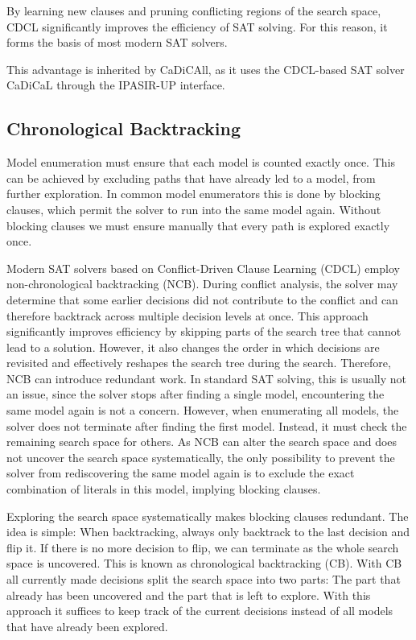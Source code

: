 \documentclass[12pt,a4paper]{article}
\begin{document}
By learning new clauses and pruning conflicting regions of the search space, CDCL significantly improves the efficiency of SAT solving. For this reason, it forms the basis of most modern SAT solvers.

This advantage is inherited by CaDiCAll, as it uses the CDCL-based SAT solver CaDiCaL through the IPASIR-UP interface.

\subsection{Chronological Backtracking}
\label{sec:chronological_backtracking}

Model enumeration must ensure that each model is counted exactly once. This can be achieved by excluding paths that have already led to a model, from further exploration. In common model enumerators this is done by blocking clauses, which permit the solver to run into the same model again. Without blocking clauses we must ensure manually that every path is explored exactly once.

Modern SAT solvers based on Conflict-Driven Clause Learning (CDCL) employ non-chronological backtracking (NCB). During conflict analysis, the solver may determine that some earlier decisions did not contribute to the conflict and can therefore backtrack across multiple decision levels at once. This approach significantly improves efficiency by skipping parts of the search tree that cannot lead to a solution. However, it also changes the order in which decisions are revisited and effectively reshapes the search tree during the search. Therefore, NCB can introduce redundant work. In standard SAT solving, this is usually not an issue, since the solver stops after finding a single model, encountering the same model again is not a concern. However, when enumerating all models, the solver does not terminate after finding the first model. Instead, it must check the remaining search space for others. As NCB can alter the search space and does not uncover the search space systematically, the only possibility to prevent the solver from rediscovering the same model again is to exclude the exact combination of literals in this model, implying blocking clauses.

Exploring the search space systematically makes blocking clauses redundant. The idea is simple: When backtracking, always only backtrack to the last decision and flip it. If there is no more decision to flip, we can terminate as the whole search space is uncovered. This is known as chronological backtracking (CB). With CB all currently made decisions split the search space into two parts: The part that already has been uncovered and the part that is left to explore. With this approach it suffices to keep track of the current decisions instead of all models that have already been explored.
\end{document}
